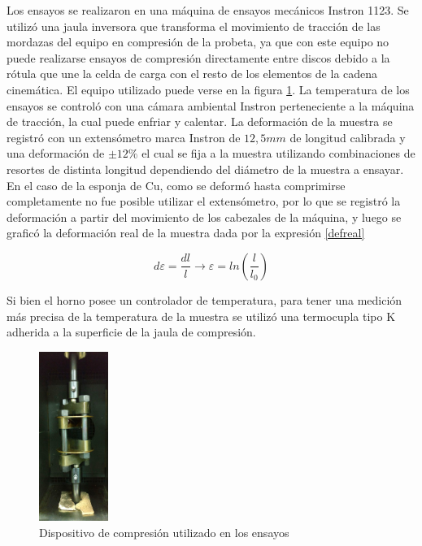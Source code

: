 \documentclass[a4paper,12pt,fleqn,twoside,openany]{book}
\begin{document}
Los ensayos se realizaron en una máquina de ensayos mecánicos Instron 1123. Se utilizó una jaula inversora que transforma el movimiento de tracción de las mordazas del equipo en compresión de la probeta, ya que con este equipo no puede realizarse ensayos de compresión directamente entre discos debido a la rótula que une la celda de carga con el resto de los elementos de la cadena cinemática. El equipo utilizado puede verse en la figura \ref{fig:jaula}. La 
temperatura de los ensayos se controló con una cámara ambiental Instron 
perteneciente a la máquina de tracción, la cual puede enfriar y calentar.
La deformación de la muestra se registró con un extensómetro marca Instron de $12,5 mm$ de longitud calibrada y una deformación de $\pm 12\%$ el cual se fija a la muestra utilizando combinaciones de 
resortes de distinta longitud dependiendo del diámetro de la muestra a ensayar. En el caso de la esponja de Cu, como se deformó hasta comprimirse 
completamente no fue posible utilizar el extensómetro, por lo que se registró la deformación a partir del movimiento de los cabezales de la máquina, y luego 
se graficó la deformación real de la muestra dada por la expresión \ref{defreal}

\begin{equation}
d \varepsilon = \frac{dl}{l}  \longrightarrow  \varepsilon =ln \left(\frac{l}{l_0}\right) \label{defreal} 
\end{equation}



Si bien el horno posee un controlador de temperatura, para tener una medición
más precisa de la temperatura de la muestra se utilizó una termocupla tipo K adherida a la superficie de la jaula de compresión.

\begin{figure}[h]
 \centering
 \includegraphics[width=0.2\textwidth]{Img/Procedimiento/jaula.jpg}
 \caption{Dispositivo de compresión utilizado en los ensayos} 
 \label{fig:jaula}
 \end{figure}
\end{document}
